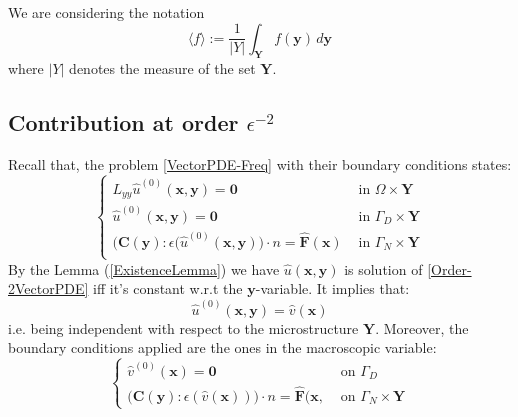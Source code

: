 \begin{rem}
We are considering the notation
\begin{equation*}
    \langle f \rangle := \frac{1}{\vert Y \vert} \int_{\mathbf{Y}} f(\mathbf{y}) \, d\mathbf{y}
\end{equation*}
where $\vert Y \vert$ denotes the measure of the set $\mathbf{Y}$.
\end{rem}

\subsection{Contribution at order $\epsilon^{-2}$}
Recall that, the problem \ref{VectorPDE-Freq} with their boundary conditions states:
\begin{equation}
    \label{Order-2VectorPDE}
    \left \{
    \begin{array}{cc}
        L_{yy} \hat{u}^{(0)}( \mathbf{x},\mathbf{y}) = \mathbf{0} & \text{ in } \Omega \times \mathbf{Y}\\
        \hat{u}^{(0)} (\mathbf{x},\mathbf{y}) = \mathbf{0} & \text{ in } \Gamma_D \times \mathbf{Y} \\
        \big( \mathbf{C}(\mathbf{y}) :\epsilon(\hat{u}^{(0)}(\mathbf{x},\mathbf{y}) \big) \cdot n = \hat{\mathbf{F}}(\mathbf{x}) & \text{ in } \Gamma_N \times \mathbf{Y} \\
    \end{array}
    \right .
\end{equation}
By the Lemma (\ref{ExistenceLemma}) we have $\hat{u}(\mathbf{x},\mathbf{y})$ is solution of \ref{Order-2VectorPDE} iff it's constant w.r.t the $\mathbf{y}$-variable. It implies that:
\begin{equation}
    \label{IndepencyofY}
    \hat{u}^{(0)}(\mathbf{x},\mathbf{y}) = \hat{v}(\mathbf{x})
\end{equation}
i.e. being independent with respect to the microstructure $\mathbf{Y}$. Moreover, the boundary conditions applied are the ones in the macroscopic variable:
\begin{equation*}
    \left \{
    \begin{array}{cc}
        \hat{v}^{(0)}(\mathbf{x}) = \mathbf{0} & \text{ on } \Gamma_D\\
        \big(\mathbf{C}(\mathbf{y}):\epsilon(\hat{v}(\mathbf{x})) \big) \cdot n = \hat{\mathbf{F}}(\mathbf{x}, & \text{ on } \Gamma_N \times \mathbf{Y}
    \end{array}
    \right .
\end{equation*}

